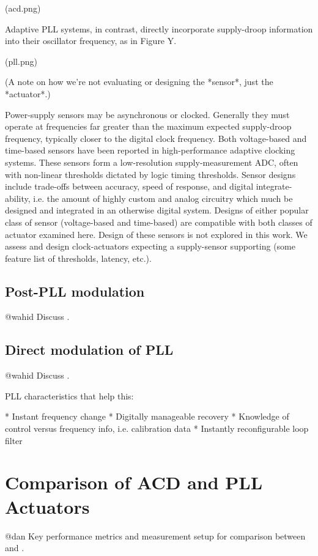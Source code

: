 \documentclass{IEEEtran}
\begin{document}
(acd.png)

Adaptive PLL systems, in contrast, directly incorporate supply-droop information into their oscillator frequency, as in Figure Y. 

(pll.png)

(A note on how we're not evaluating or designing the *sensor*, just the *actuator*.)

Power-supply sensors may be asynchronous or clocked. Generally they must operate at frequencies far greater than the maximum expected supply-droop frequency, typically closer to the digital clock frequency. Both voltage-based and time-based sensors have been reported in high-performance adaptive clocking systems. These sensors form a low-resolution supply-measurement ADC, often with non-linear thresholds dictated by logic timing thresholds. Sensor designs include trade-offs between accuracy, speed of response, and digital integrate-ability, i.e. the amount of highly custom and analog circuitry which much be designed and integrated in an otherwise digital system. Designs of either popular class of sensor (voltage-based and time-based) are compatible with both classes of actuator examined here. Design of these sensors is not explored in this work. We assess and design clock-actuators expecting a supply-sensor supporting (some feature list of thresholds, latency, etc.). 


\subsection{Post-PLL modulation}

@wahid
Discuss \cite{wilcox2015}.

\subsection{Direct modulation of PLL}

@wahid
Discuss \cite{hashimoto2018}.

PLL characteristics that help this:

* Instant frequency change
* Digitally manageable recovery
* Knowledge of control versus frequency info, i.e. calibration data 
* Instantly reconfigurable loop filter

\section{Comparison of ACD and PLL Actuators}

@dan
Key performance metrics and measurement setup for comparison between \cite{hashimoto2018} and \cite{wilcox2015}.
\end{document}
